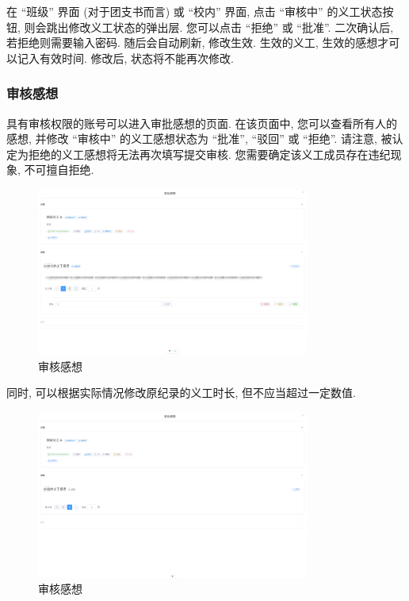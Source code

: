 \documentclass{article}
\begin{document}
在 ``班级'' 界面 (对于团支书而言) 或 ``校内'' 界面, 点击 ``审核中'' 的义工状态按钮, 则会跳出修改义工状态的弹出层. 您可以点击 ``拒绝'' 或 ``批准''. 二次确认后, 若拒绝则需要输入密码. 随后会自动刷新, 修改生效. 生效的义工, 生效的感想才可以记入有效时间. 修改后, 状态将不能再次修改.

\subsubsection{审核感想}

具有审核权限的账号可以进入审批感想的页面. 在该页面中, 您可以查看所有人的感想, 并修改 ``审核中'' 的义工感想状态为 ``批准'', ``驳回'' 或 ``拒绝''. 请注意, 被认定为拒绝的义工感想将无法再次填写提交审核. 您需要确定该义工成员存在违纪现象, 不可擅自拒绝.

\begin{figure}[H]
  \centering
  \includegraphics[width=0.8\textwidth]{../assets/image-20240303154558556.png}
  \caption{审核感想}
  \label{fig:volunteer-feelings-audit}
\end{figure}

同时, 可以根据实际情况修改原纪录的义工时长, 但不应当超过一定数值.

\begin{figure}[H]
  \centering
  \includegraphics[width=0.8\textwidth]{../assets/image-20240303161514901.png}
  \caption{审核感想}
  \label{fig:volunteer-feelings-audit-time}
\end{figure}
\end{document}
